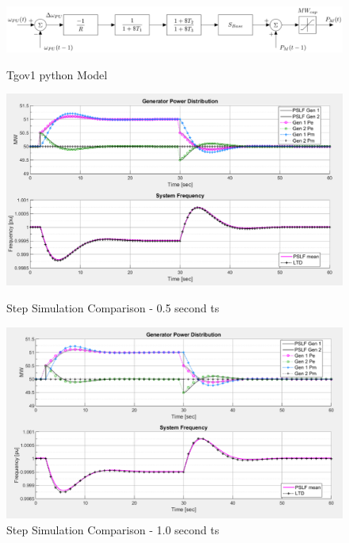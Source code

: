 \documentclass[12pt]{article}
\begin{document}
	\begin{figure}[ht!]
		\begin{center}
		\includegraphics[width=\linewidth]{tgov1_model}\vspace{-1em}
		\caption{Tgov1 python Model}\vspace{1em}
		\label{tgov1}		 

		\includegraphics[width=.95\linewidth]{matlab_comparison03}  \vspace{-1em}
		\caption{Step Simulation Comparison - 0.5 second ts}\vspace{+.5em}
		\label{step1}
			
		\includegraphics[width=.95\linewidth]{matlab_comparison04}  \vspace{-1em}
		\caption{Step Simulation Comparison - 1.0 second ts}
		\label{step2}
			\end{center}
		\end{figure}
\pagebreak
\end{document}
